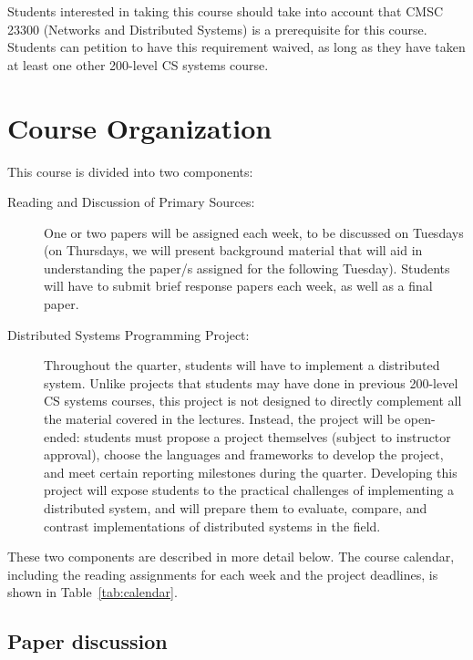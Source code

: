 \documentclass[11pt]{article}
\begin{document}
Students interested in taking this course should take into account that CMSC 23300 (Networks and Distributed Systems) is a prerequisite for this course. Students can petition to have this requirement waived, as long as they have taken at least one other 200-level CS systems course.

\pagebreak

\section{Course Organization}

This course is divided into two components:

\begin{description}

 \item[Reading and Discussion of Primary Sources:] One or two papers will be assigned each week, to be discussed on Tuesdays (on Thursdays, we will present background material that will aid in understanding the paper/s assigned for the following Tuesday). Students will have to submit brief response papers each week, as well as a final paper.

 \item[Distributed Systems Programming Project:] Throughout the quarter, students will have to implement a distributed system. Unlike projects that students may have done in previous 200-level CS systems courses, this project is not designed to directly complement all the material covered in the lectures. Instead, the project will be open-ended: students must propose a project themselves (subject to instructor approval), choose the languages and frameworks to develop the project, and meet certain reporting milestones during the quarter. Developing this project will expose students to the practical challenges of implementing a distributed system, and will prepare them to evaluate, compare, and contrast implementations of distributed systems in the field.

\end{description}

These two components are described in more detail below. The course calendar, including the reading assignments for each week and the project deadlines, is shown in Table~\ref{tab:calendar}.

\subsection{Paper discussion}
\end{document}
